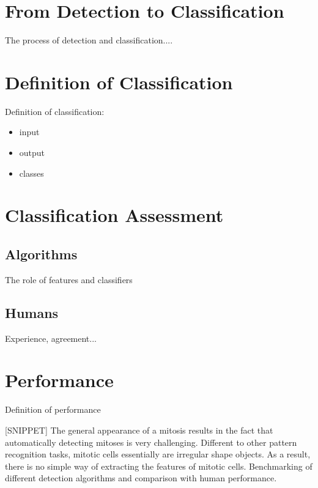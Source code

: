 \section{From Detection to Classification}

The process of detection and classification....

\vspace{0.5cm}

\section{Definition of Classification}

Definition of classification:
\begin{itemize}
\item input
\item output
\item classes
\end{itemize}

\vspace{0.5cm}

\section{Classification Assessment}

\subsection{Algorithms}

The role of features and classifiers

\subsection{Humans}

Experience, agreement...

\vspace{0.5cm}

\section{Performance}

Definition of performance


[SNIPPET]
The general appearance of a mitosis results in the fact that automatically detecting mitoses is very challenging.
Different to other pattern recognition tasks, mitotic cells essentially are irregular shape objects. As a result, there
is no simple way of extracting the features of mitotic cells.
Benchmarking of different detection algorithms and comparison with human performance.


